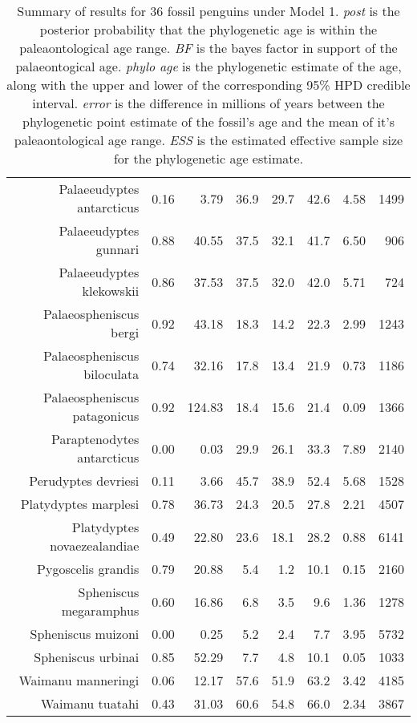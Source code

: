 \begin{table}[ht]
\begin{tabular}{rrrrrrrr}
  Palaeeudyptes antarcticus & 0.16 & 3.79 & 36.9 & 29.7 & 42.6 & 4.58 & 1499 \\ 
  Palaeeudyptes gunnari & 0.88 & 40.55 & 37.5 & 32.1 & 41.7 & 6.50 & 906 \\ 
  Palaeeudyptes klekowskii & 0.86 & 37.53 & 37.5 & 32.0 & 42.0 & 5.71 & 724 \\ 
  Palaeospheniscus bergi & 0.92 & 43.18 & 18.3 & 14.2 & 22.3 & 2.99 & 1243 \\ 
  Palaeospheniscus biloculata & 0.74 & 32.16 & 17.8 & 13.4 & 21.9 & 0.73 & 1186 \\ 
  Palaeospheniscus patagonicus & 0.92 & 124.83 & 18.4 & 15.6 & 21.4 & 0.09 & 1366 \\ 
  Paraptenodytes antarcticus & 0.00 & 0.03 & 29.9 & 26.1 & 33.3 & 7.89 & 2140 \\ 
  Perudyptes devriesi & 0.11 & 3.66 & 45.7 & 38.9 & 52.4 & 5.68 & 1528 \\ 
  Platydyptes marplesi & 0.78 & 36.73 & 24.3 & 20.5 & 27.8 & 2.21 & 4507 \\ 
  Platydyptes novaezealandiae & 0.49 & 22.80 & 23.6 & 18.1 & 28.2 & 0.88 & 6141 \\ 
  Pygoscelis grandis & 0.79 & 20.88 & 5.4 & 1.2 & 10.1 & 0.15 & 2160 \\ 
  Spheniscus megaramphus & 0.60 & 16.86 & 6.8 & 3.5 & 9.6 & 1.36 & 1278 \\ 
  Spheniscus muizoni & 0.00 & 0.25 & 5.2 & 2.4 & 7.7 & 3.95 & 5732 \\ 
  Spheniscus urbinai & 0.85 & 52.29 & 7.7 & 4.8 & 10.1 & 0.05 & 1033 \\ 
  Waimanu manneringi & 0.06 & 12.17 & 57.6 & 51.9 & 63.2 & 3.42 & 4185 \\ 
  Waimanu tuatahi & 0.43 & 31.03 & 60.6 & 54.8 & 66.0 & 2.34 & 3867 \\ 
   \hline
\end{tabular}
\caption{Summary of results for 36 fossil penguins under Model 1. {\em post} is the posterior probability that the phylogenetic age is within the paleaontological age range. {\em BF} is the bayes factor in support of the palaeontogical age. {\em phylo age} is the phylogenetic estimate of the age, along with the upper and lower of the corresponding 95\% HPD credible interval. {\em error} is the difference in millions of years between the phylogenetic point estimate of the fossil's age and the mean of it's paleaontological age range. {\em ESS} is the estimated effective sample size for the phylogenetic age estimate.} 
\label{fossilTable1}
\end{table}

